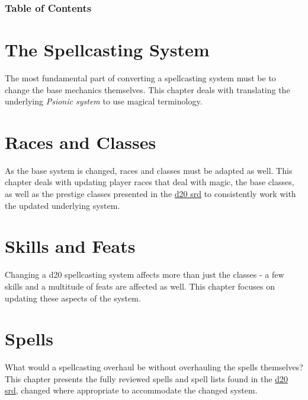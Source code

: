 \documentclass[a4paper,10pt]{article}
\begin{document}
\section{Table of Contents}
\setlength{\columnsep}{0.5in}
\begin{multicols}{2} %
\scriptsize
\tableofcontents
\listoftables
\listoffigures
\normalsize
\end{multicols}
\newpage
\begin{multicols}{2}

\part{The Spellcasting System} %
The most fundamental part of converting a spellcasting system must be to change the base mechanics themselves. This chapter deals with translating the underlying \emph{Psionic system} to use magical terminology.
 \newpage

\part{Races and Classes}
As the base system is changed, races and classes must be adapted as well. This chapter deals with updating player races that deal with magic, the base classes, as well as the prestige classes presented in the \href{http://www.wizards.com/default.asp?x=d20/article/srd35}{d20 srd} to consistently work with the updated underlying system.
 \newpage

\part{Skills and Feats}
Changing a d20 spellcasting system affects more than just the classes - a few skills and a multitude of feats are affected as well. This chapter focuses on updating these aspects of the system.


\part{Spells}
What would a spellcasting overhaul be without overhauling the spells themselves? This chapter presents the fully reviewed spells and spell lists found in the \href{http://www.wizards.com/default.asp?x=d20/article/srd35}{d20 srd}, changed where appropriate to accommodate the changed system.


\end{multicols}
\end{document}
